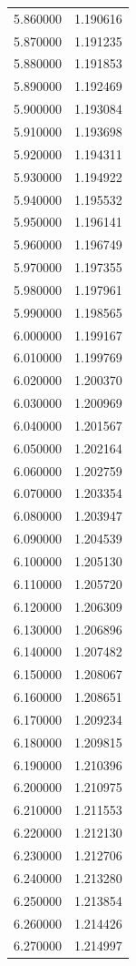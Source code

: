 \begin{tabular}{rr}
5.860000 & 1.190616 \\
5.870000 & 1.191235 \\
5.880000 & 1.191853 \\
5.890000 & 1.192469 \\
5.900000 & 1.193084 \\
5.910000 & 1.193698 \\
5.920000 & 1.194311 \\
5.930000 & 1.194922 \\
5.940000 & 1.195532 \\
5.950000 & 1.196141 \\
5.960000 & 1.196749 \\
5.970000 & 1.197355 \\
5.980000 & 1.197961 \\
5.990000 & 1.198565 \\
6.000000 & 1.199167 \\
6.010000 & 1.199769 \\
6.020000 & 1.200370 \\
6.030000 & 1.200969 \\
6.040000 & 1.201567 \\
6.050000 & 1.202164 \\
6.060000 & 1.202759 \\
6.070000 & 1.203354 \\
6.080000 & 1.203947 \\
6.090000 & 1.204539 \\
6.100000 & 1.205130 \\
6.110000 & 1.205720 \\
6.120000 & 1.206309 \\
6.130000 & 1.206896 \\
6.140000 & 1.207482 \\
6.150000 & 1.208067 \\
6.160000 & 1.208651 \\
6.170000 & 1.209234 \\
6.180000 & 1.209815 \\
6.190000 & 1.210396 \\
6.200000 & 1.210975 \\
6.210000 & 1.211553 \\
6.220000 & 1.212130 \\
6.230000 & 1.212706 \\
6.240000 & 1.213280 \\
6.250000 & 1.213854 \\
6.260000 & 1.214426 \\
6.270000 & 1.214997 \\

\end{tabular}
